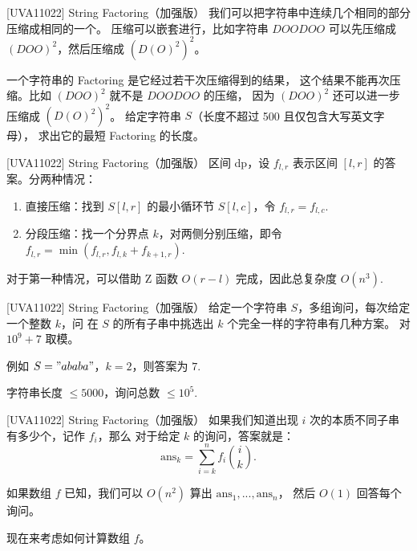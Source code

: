 \documentclass{beamer}
\begin{document}
\begin{frame}[fragile]{[UVA11022] String Factoring（加强版）}
    \small
    我们可以把字符串中连续几个相同的部分压缩成相同的一个。
    压缩可以嵌套进行，比如字符串 $DOODOO$ 可以先压缩成 $(DOO)^2$，然后压缩成 $(D(O)^2)^2$。

    \vspace{1em}
    一个字符串的 Factoring 是它经过若干次压缩得到的结果，
    这个结果不能再次压缩。比如 $(DOO)^2$ 就不是 $DOODOO$ 的压缩，
    因为 $(DOO)^2$ 还可以进一步压缩成 $(D(O)^2)^2$。
    给定字符串 $S$（长度不超过 500 且仅包含大写英文字母），
    求出它的最短 Factoring 的长度。
\end{frame}

\begin{frame}[fragile]{[UVA11022] String Factoring（加强版）}
    \small
    区间 dp，设 $f_{l,r}$ 表示区间 $[l,r]$ 的答案。分两种情况：

    \begin{enumerate}
        \pause \item 直接压缩：找到 $S[l,r]$ 的最小循环节 $S[l,c]$，令 $f_{l,r}=f_{l,c}$.
        \pause \item 分段压缩：找一个分界点 $k$，对两侧分别压缩，即令 $f_{l,r}=\min(f_{l,r},f_{l,k}+f_{k+1,r})$.
    \end{enumerate}

    \pause 对于第一种情况，可以借助 Z 函数 $O(r-l)$ 完成，因此总复杂度 $O(n^3)$.
\end{frame}

\begin{frame}[fragile]{[UVA11022] String Factoring（加强版）}
    \small
    给定一个字符串 $S$，多组询问，每次给定一个整数 $k$，问
    在 $S$ 的所有子串中挑选出 $k$ 个完全一样的字符串有几种方案。
    对 $10^9+7$ 取模。

    \vspace{1em}
    例如 $S="ababa"$，$k=2$，则答案为 $7$.

    \vspace{1em}
    字符串长度 $\leq 5000$，询问总数 $\leq 10^5$.
\end{frame}

\begin{frame}[fragile]{[UVA11022] String Factoring（加强版）}
    \small
    如果我们知道出现 $i$ 次的本质不同子串有多少个，记作 $f_i$，那么
    对于给定 $k$ 的询问，答案就是：
    \begin{equation*}
        \text{ans}_k=\sum_{i=k}^n f_i \binom{i}{k}.
    \end{equation*}

    如果数组 $f$ 已知，我们可以 $O(n^2)$ 算出 $\text{ans}_1,...,\text{ans}_n$，
    然后 $O(1)$ 回答每个询问。

    \vspace{1em}\pause
    现在来考虑如何计算数组 $f$。
\end{frame}
\end{document}
